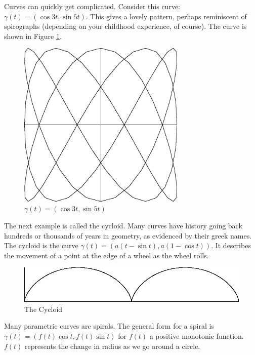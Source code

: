 \documentclass[fleqn]{report}
\begin{document}
\begin{example}
Curves can quickly get complicated. Consider this curve:
$\gamma(t) = (\cos 3t, \sin 5t)$. This gives a lovely pattern,
perhaps reminiscent of spirographs (depending on your childhood
experience, of course). The curve is shown in Figure
\ref{figure-parametric-curve2}.
\end{example}

\begin{figure}[ht]
\centering
\includegraphics[width=8cm]{figure11.eps}
\caption{$\gamma(t) = (\cos 3t, \sin 5t)$}
\label{figure-parametric-curve2}
\end{figure}

\begin{example}
The next example is called the cycloid. Many curves have
history going back hundreds or thousands of years in geometry,
as evidenced by their greek names. The cycloid is the curve
$\gamma(t) = (a(t-\sin t), a(1-\cos t))$. It describes the
movement of a point at the edge of a wheel as the wheel rolls.
\end{example}

\begin{figure}[ht]
\centering
\includegraphics[width=14cm]{figure12.eps}
\caption{The Cycloid}
\label{figure-parametric-curve3}
\end{figure}

Many parametric curves are spirals. The general form for a
spiral is $\gamma(t) = (f(t) \cos t, f(t) \sin t)$ for $f(t)$
a positive monotonic function. $f(t)$ represents the change
in radius as we go around a circle.
\end{document}

